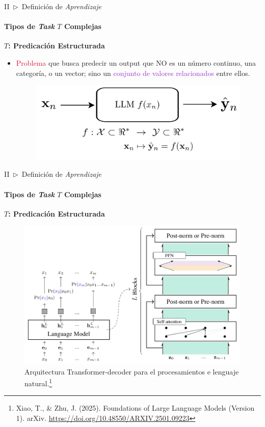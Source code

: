 \documentclass[xcolor=dvipsnames]{beamer}
\begin{document}
    \begin{frame}{II~$\rhd$~Definición de \textit{Aprendizaje}}
    \framesubtitle{Tipos de \textit{Task} \( T \) Complejas}
        \textbf{\Large{\( T \): Predicación Estructurada}}
        \vspace{2mm}
        \begin{itemize}
            \item \textcolor{crimson}{Problema} que busca predecir un output que NO es un número continuo, una categoría, o un vector; sino un \textcolor{DarkOrchid}{conjunto de valores relacionados} entre ellos.
            \vspace{1mm}
            \begin{figure}
                \centering
                \includegraphics[width=0.8\linewidth]{imgs/def01/task07.png}
            \end{figure}
        \end{itemize}
    \end{frame}

    \begin{frame}{II~$\rhd$~Definición de \textit{Aprendizaje}}
    \framesubtitle{Tipos de \textit{Task} \( T \) Complejas}
        \textbf{\Large{\( T \): Predicación Estructurada}}
        \vspace{2mm}
        \begin{figure}
            \centering
            \includegraphics[width=0.7\linewidth]{imgs/def01/xiao2025foundationslargelanguagemodels-img01.png}
            \caption{Arquitectura Transformer-decoder para el procesamientos e lenguaje natural.\footnote{\tiny{Xiao, T., \& Zhu, J. (2025). Foundations of Large Language Models (Version 1). arXiv. \url{https://doi.org/10.48550/ARXIV.2501.09223}}}}
        \end{figure}
    \end{frame}
\end{document}
